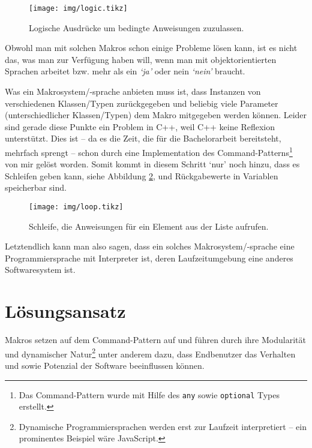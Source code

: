     \begin{figure}[H]
      \centering
      \texttt{[image: img/logic.tikz]}
      \caption{Logische Ausdrücke um bedingte Anweisungen zuzulassen.}
      \label{fig:logic}
    \end{figure}

    Obwohl man mit solchen Makros schon einige Probleme lösen kann, ist es nicht das, was man zur Verfügung haben will, wenn man mit objektorientierten Sprachen arbeitet bzw. mehr als ein \textit{`ja'} oder nein \textit{`nein'} braucht.

    Was ein Makrosystem/-sprache anbieten muss ist, dass Instanzen von verschiedenen Klassen/Typen zurückgegeben und beliebig viele Parameter (unterschiedlicher Klassen/Typen) dem Makro mitgegeben werden können. Leider sind gerade diese Punkte ein Problem in C++, weil C++ keine Reflexion\autocites{vinoski2005time}{ferber1989computational} unterstützt. Dies ist -- da es die Zeit, die für die Bachelorarbeit bereitsteht, mehrfach sprengt -- schon durch eine Implementation des Command-Patterns\footnote{%
      Das Command-Pattern wurde mit Hilfe des \texttt{any}
      sowie \texttt{optional}
      Types erstellt.
    }\spewnotes{}
    von mir gelöst worden. Somit kommt in diesem Schritt `nur' noch hinzu, dass es Schleifen geben kann,  siehe Abbildung \ref{fig:loop}, und Rückgabewerte in Variablen speicherbar sind.

    \begin{figure}[H]
      \centering
      \texttt{[image: img/loop.tikz]}
      \caption{Schleife, die Anweisungen für ein Element aus der Liste aufrufen.}
      \label{fig:loop}
    \end{figure}

    Letztendlich kann man also sagen, dass ein solches Makrosystem/-sprache eine Programmiersprache mit Interpreter\autocite[S.274]{Gamma:1995:DPE:186897} ist, deren Laufzeitumgebung eine anderes Softwaresystem ist.

\section{Lösungsansatz}
\label{sec:loesungsansatz}
  Makros setzen auf dem Command-Pattern\autocite[S.263]{Gamma:1995:DPE:186897} auf und führen durch ihre Modularität und dynamischer Natur\footnote{%
    Dynamische Programmiersprachen werden erst zur Laufzeit interpretiert -- ein prominentes Beispiel wäre JavaScript.
  } unter anderem dazu, dass Endbenutzer das Verhalten und sowie Potenzial der Software beeinflussen können.

